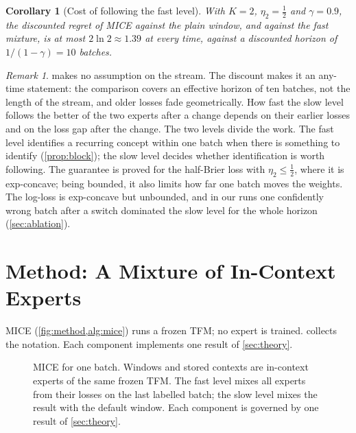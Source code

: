 \documentclass[11pt]{article}
\theoremstyle{plain}
\newtheorem{corollary}{Corollary}
\theoremstyle{definition}
\theoremstyle{remark}
\newtheorem{remark}{Remark}
\newcommand{\method}{\textsc{MICE}}   %
\begin{document}
\begin{corollary}[Cost of following the fast level]\label{cor:outer}
With $K=2$, $\eta_2=\tfrac12$ and $\gamma=0.9$, the discounted regret of \method{} against the plain window, and
against the fast mixture, is at most $2\ln2\approx1.39$ at every time, against a discounted horizon of
$1/(1-\gamma)=10$ batches.
\end{corollary}

\begin{remark}
 makes no assumption on the stream. The discount makes it an any-time statement: the comparison covers an
effective horizon of ten batches, not the length of the stream, and older losses fade geometrically. How fast the
slow level follows the better of the two experts after a change depends on their earlier losses and on the loss gap
after the change. The two levels divide the work. The fast level identifies a recurring concept within one batch when there
is something to identify (\cref{prop:block}); the slow level decides whether identification is worth following. The
guarantee is proved for the half-Brier loss with $\eta_2\le\tfrac12$, where it is exp-concave; being bounded, it also
limits how far one batch moves the weights. The log-loss is exp-concave but unbounded, and in our runs one confidently
wrong batch after a switch dominated the slow level for the whole horizon (\cref{sec:ablation}).
\end{remark}

\section{Method: A Mixture of In-Context Experts}
\label{sec:method}

\method{} (\cref{fig:method,alg:mice}) runs a frozen TFM; no expert is trained.  collects the notation. Each component implements one result of
\cref{sec:theory}.

\begin{figure}[t]
  \centering
  \resizebox{0.8\textwidth}{!}{}
  \caption{\method{} for one batch. Windows and stored contexts are in-context experts of the same frozen TFM. The
  fast level mixes all experts from their losses on the last labelled batch; the slow level mixes the result with the
  default window. Each component is governed by one result of \cref{sec:theory}.}
  \label{fig:method}
\end{figure}
\end{document}
